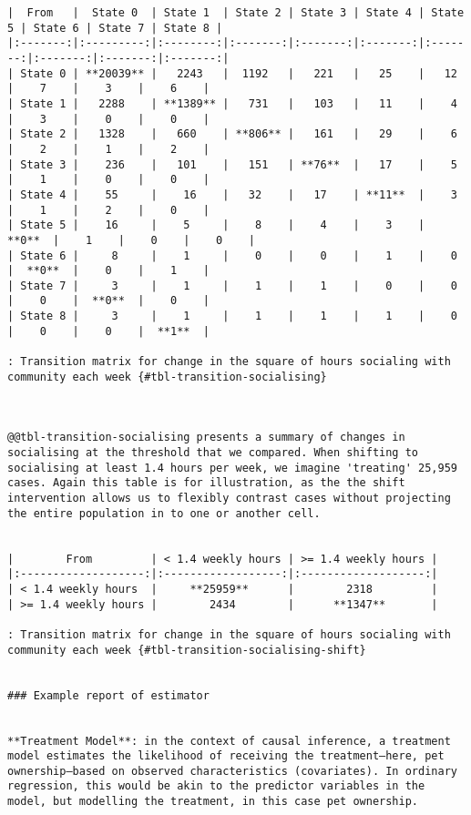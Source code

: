 \documentclass[
  singlecolumn]{article}
\begin{document}
\begin{verbatim}
|  From   |  State 0  | State 1  | State 2 | State 3 | State 4 | State 5 | State 6 | State 7 | State 8 |
|:-------:|:---------:|:--------:|:-------:|:-------:|:-------:|:-------:|:-------:|:-------:|:-------:|
| State 0 | **20039** |   2243   |  1192   |   221   |   25    |   12    |    7    |    3    |    6    |
| State 1 |   2288    | **1389** |   731   |   103   |   11    |    4    |    3    |    0    |    0    |
| State 2 |   1328    |   660    | **806** |   161   |   29    |    6    |    2    |    1    |    2    |
| State 3 |    236    |   101    |   151   | **76**  |   17    |    5    |    1    |    0    |    0    |
| State 4 |    55     |    16    |   32    |   17    | **11**  |    3    |    1    |    2    |    0    |
| State 5 |    16     |    5     |    8    |    4    |    3    |  **0**  |    1    |    0    |    0    |
| State 6 |     8     |    1     |    0    |    0    |    1    |    0    |  **0**  |    0    |    1    |
| State 7 |     3     |    1     |    1    |    1    |    0    |    0    |    0    |  **0**  |    0    |
| State 8 |     3     |    1     |    1    |    1    |    1    |    0    |    0    |    0    |  **1**  |

: Transition matrix for change in the square of hours socialing with community each week {#tbl-transition-socialising}



@@tbl-transition-socialising presents a summary of changes in socialising at the threshold that we compared. When shifting to socialising at least 1.4 hours per week, we imagine 'treating' 25,959 cases. Again this table is for illustration, as the the shift intervention allows us to flexibly contrast cases without projecting the entire population in to one or another cell.  


|        From         | < 1.4 weekly hours | >= 1.4 weekly hours |
|:-------------------:|:------------------:|:-------------------:|
| < 1.4 weekly hours  |     **25959**      |        2318         |
| >= 1.4 weekly hours |        2434        |      **1347**       |

: Transition matrix for change in the square of hours socialing with community each week {#tbl-transition-socialising-shift}


### Example report of estimator


**Treatment Model**: in the context of causal inference, a treatment model estimates the likelihood of receiving the treatment—here, pet ownership—based on observed characteristics (covariates). In ordinary regression, this would be akin to the predictor variables in the model, but modelling the treatment, in this case pet ownership.


\end{verbatim}
\end{document}
